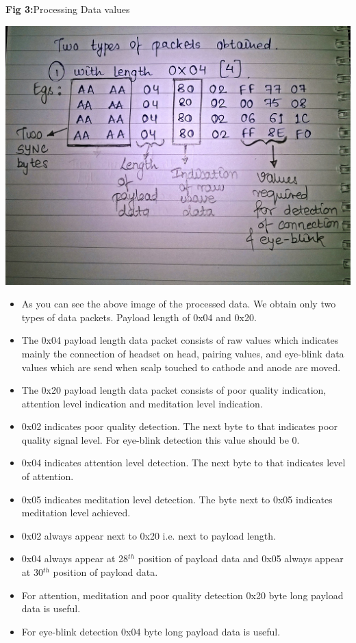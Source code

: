 \documentclass[12pt]{article}
\begin{document}
\begin{enumerate}
\begin{enumerate}
\begin{center}
	\textbf{Fig 3:}Processing Data values
	\graphicspath{ {images/} }
	\includegraphics[width=15cm, height=10cm]{Process1}
\end{center}
\begin{itemize}
	\item As you can see the above image of the processed data. We obtain only two types of data packets. Payload length of 0x04 and 0x20. 
	\item The 0x04 payload length data packet consists of raw values which indicates mainly the connection of headset on head, pairing values, and eye-blink data values which are send when scalp touched to cathode and anode are moved.
	\item The 0x20 payload length data packet consists of poor quality indication, attention level indication and meditation level indication.
	\item 0x02 indicates poor quality detection. The next byte to that indicates poor quality signal level. For eye-blink detection this value should be 0.
	\item 0x04 indicates attention level detection. The next byte to that indicates level of attention.
	\item 0x05 indicates meditation level detection. The byte next to 0x05 indicates meditation level achieved.
	\item 0x02 always appear next to 0x20 i.e. next to payload length.
	\item 0x04 always appear at 28$^{th}$ position of payload data and 0x05 always appear
at 30$^{th}$ position of payload data.
	\item For attention, meditation and poor quality detection 0x20 byte long payload data is useful.
	\item For eye-blink detection 0x04 byte long payload data is useful.
\end{itemize}
\end{enumerate}


\end{enumerate}
\end{document}

